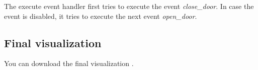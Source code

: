 The execute event handler first tries to execute the event \textit{close\_door}.
In case the event is disabled, it tries to execute the next event \textit{open\_door}.


\subsection{Final visualization}

You can download the final visualization .
